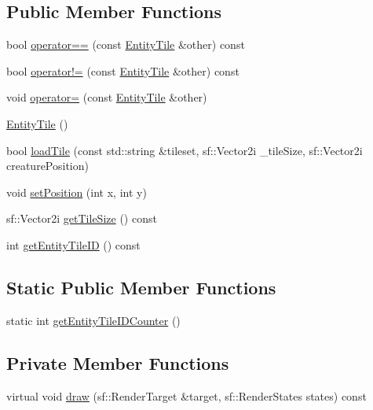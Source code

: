 \subsection*{Public Member Functions}
\begin{DoxyCompactItemize}
\item 
bool \mbox{\hyperlink{class_entity_tile_a2b8c81d35530991c08ca2b6a76e436bf}{operator==}} (const \mbox{\hyperlink{class_entity_tile}{Entity\+Tile}} \&other) const
\item 
bool \mbox{\hyperlink{class_entity_tile_ad5adfda10fac26073effad1f16d6ffb6}{operator!=}} (const \mbox{\hyperlink{class_entity_tile}{Entity\+Tile}} \&other) const
\item 
void \mbox{\hyperlink{class_entity_tile_a81dbf6b294b80d6edcc830a243cdfae8}{operator=}} (const \mbox{\hyperlink{class_entity_tile}{Entity\+Tile}} \&other)
\item 
\mbox{\hyperlink{class_entity_tile_a7339ed82b7f4d506ef34f99b1446714a}{Entity\+Tile}} ()
\item 
bool \mbox{\hyperlink{class_entity_tile_a1a6b6b995ad942e7850f14cc6e693bbc}{load\+Tile}} (const std\+::string \&tileset, sf\+::\+Vector2i \+\_\+tile\+Size, sf\+::\+Vector2i creature\+Position)
\item 
void \mbox{\hyperlink{class_entity_tile_a7b9e5be8dc4017eb5af8e4fda7add3c4}{set\+Position}} (int x, int y)
\item 
sf\+::\+Vector2i \mbox{\hyperlink{class_entity_tile_a73cc06d0699f6d30a08d93e5cf9afe3b}{get\+Tile\+Size}} () const
\item 
int \mbox{\hyperlink{class_entity_tile_ae03bd8f12e01ddeb289be1b7229386ca}{get\+Entity\+Tile\+ID}} () const
\end{DoxyCompactItemize}
\subsection*{Static Public Member Functions}
\begin{DoxyCompactItemize}
\item 
static int \mbox{\hyperlink{class_entity_tile_acabd6691ddcf65a812c38e86e12e28e7}{get\+Entity\+Tile\+I\+D\+Counter}} ()
\end{DoxyCompactItemize}
\subsection*{Private Member Functions}
\begin{DoxyCompactItemize}
\item 
virtual void \mbox{\hyperlink{class_entity_tile_a1d61eb82fed61b1c7aebc54249bd7c80}{draw}} (sf\+::\+Render\+Target \&target, sf\+::\+Render\+States states) const
\end{DoxyCompactItemize}
